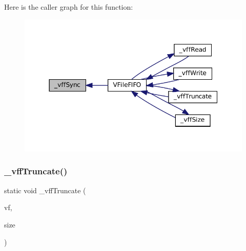 Here is the caller graph for this function\+:
\nopagebreak
\begin{figure}[H]
\begin{center}
\leavevmode
\includegraphics[width=350pt]{vfs-fifo_8c_ad31804a57b1b09d56fcefadca87ba2d1_icgraph}
\end{center}
\end{figure}
\mbox{\label{vfs-fifo_8c_a44e1cdacc71a8e16868d8c968e644ec6}} 
\subsubsection{\texorpdfstring{\+\_\+vff\+Truncate()}{\_vffTruncate()}}
{\footnotesize\ttfamily static void \+\_\+vff\+Truncate (\begin{DoxyParamCaption}\item[{struct V\+File $\ast$}]{vf,  }\item[{size\+\_\+t}]{size }\end{DoxyParamCaption})\hspace{0.3cm}{\ttfamily [static]}}

